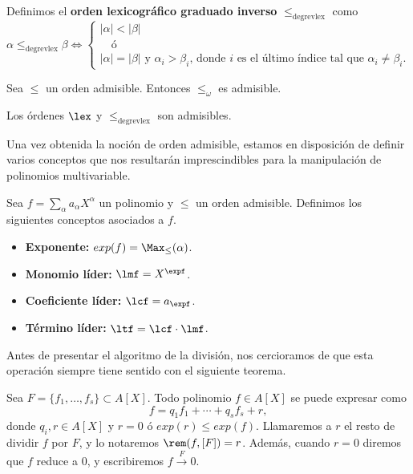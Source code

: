 \begin{definicion}
    Definimos el \textbf{orden lexicográfico graduado inverso} $\le_{\text{degrevlex}}$ como
    \begin{equation*}
        \alpha \le_{\text{degrevlex}} \beta \iff \begin{cases}
            |\alpha| < |\beta| \\
            \quad\text{ó}   \\
            |\alpha| = |\beta| \text{ y } \alpha_i > \beta_i \text{, donde $i$ es el último índice tal que } \alpha_i \neq \beta_i.
        \end{cases}
    \end{equation*}
\end{definicion}

\begin{proposicion}
    Sea $\le$ un orden admisible. Entonces $\le_{\omega}$ es admisible.
\end{proposicion}
\begin{proposicion}
    Los órdenes $\lex$ y $\le_{\text{degrevlex}}$ son admisibles.
\end{proposicion}

Una vez obtenida la noción de orden admisible, estamos en disposición de definir varios conceptos que nos resultarán imprescindibles para la manipulación de polinomios multivariable.

\begin{definicion}
    Sea $f= \sum_{\alpha} a_{\alpha} X^{\alpha}$ un polinomio y $\le$ un orden admisible. Definimos los siguientes conceptos asociados a $f$.
    \begin{itemize}
        \item \textbf{Exponente:} $exp(f) = \Max_{\le}(\alpha)$.
        \item \textbf{Monomio líder:}  $\lmf = X^{\expf}$.
        \item \textbf{Coeficiente líder:} $\lcf = a_{\expf}$.
        \item \textbf{Término líder:} $\ltf = \lcf \cdot \lmf$.
    \end{itemize}
\end{definicion}

Antes de presentar el algoritmo de la división, nos cercioramos de que esta operación siempre tiene sentido con el siguiente teorema.
\begin{teorema}
    Sea $F=\{f_1,\dots, f_s\} \subset A[X]$. Todo polinomio $f\in A[X]$ se puede expresar como
    \begin{equation*}
        f = q_1f_1 + \cdots + q_sf_s + r,
    \end{equation*}
    donde $q_i, r\in A[X]$ y $r=0$ ó $exp(r)\le exp(f)$. Llamaremos a $r$ el resto de dividir $f$ por $F$, y lo notaremos $\rem(f, [F]) = r$. Además, cuando $r=0$ diremos que $f$ reduce a $0$, y escribiremos $f \stackrel{F}{\to} 0$.
\end{teorema}

